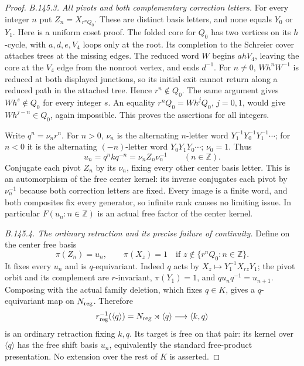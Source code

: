 \begin{proof}
\emph{B.145.3. All pivots and both complementary correction letters.}
For every integer $n$ put $Z_n=X_{r^nQ_0}$. These are distinct
basis letters, and none equals $Y_0$ or $Y_1$. Here is a uniform
coset proof. The folded core for $Q_0$ has two vertices on its
$h$-cycle, with $a,d,e,V_4$ loops only at the root. Its completion
to the Schreier cover attaches trees at the missing edges. The
reduced word $W$ begins $ahV_4$, leaving the core at the $V_4$
edge from the nonroot vertex, and ends $d^{-1}$. For $n\ne0$,
$Wh^nW^{-1}$ is reduced at both displayed junctions, so its
initial exit cannot return along a reduced path in the attached
tree. Hence $r^n\notin Q_0$. The same argument gives
$Wh^s\notin Q_0$ for every integer $s$. An equality
$r^nQ_0=Wh^jQ_0$, $j=0,1$, would give
$Wh^{j-n}\in Q_0$, again impossible. This proves the assertions
for all integers.

Write $q^n=\nu_n r^n$. For $n>0$, $\nu_n$ is the alternating
$n$-letter word $Y_1^{-1}Y_0^{-1}Y_1^{-1}\cdots$; for $n<0$
it is the alternating $(-n)$-letter word $Y_0Y_1Y_0\cdots$;
$\nu_0=1$. Thus
\begin{equation}\label{eq:B145-u}
 u_n=q^nkq^{-n}=\nu_nZ_n\nu_n^{-1}\qquad(n\in\mathbb Z).
\end{equation}
Conjugate each pivot $Z_n$ by its $\nu_n$, fixing every other
center basis letter. This is an automorphism of the free center
kernel: its inverse conjugates each pivot by $\nu_n^{-1}$ because
both correction letters are fixed. Every image is a finite word,
and both composites fix every generator, so infinite rank causes
no limiting issue. In particular $F(u_n:n\in\mathbb Z)$ is an
actual free factor of the center kernel.

\emph{B.145.4. The ordinary retraction and its precise failure of continuity.}
Define on the center free basis
\[
 \pi(Z_n)=u_n,\qquad
 \pi(X_z)=1\quad\text{if }z\notin\{r^nQ_0:n\in\mathbb Z\}.
\]
It fixes every $u_n$ and is $q$-equivariant. Indeed $q$ acts by
$X_z\mapsto Y_1^{-1}X_{rz}Y_1$; the pivot orbit and its complement
are $r$-invariant, $\pi(Y_1)=1$, and $qu_nq^{-1}=u_{n+1}$.
Composing with the actual family deletion, which fixes $q\in K$,
gives a $q$-equivariant map on $N_{\rm reg}$. Therefore
\begin{equation}\label{eq:B145-retract}
 r_{\rm reg}^{-1}(\langle q\rangle)
       =N_{\rm reg}\rtimes\langle q\rangle
       \longrightarrow\langle k,q\rangle
\end{equation}
is an ordinary retraction fixing $k,q$. Its target is free on that
pair: its kernel over $\langle q\rangle$ has the free shift basis
$u_n$, equivalently the standard free-product presentation.
No extension over the rest of $K$ is asserted.


\end{proof}

